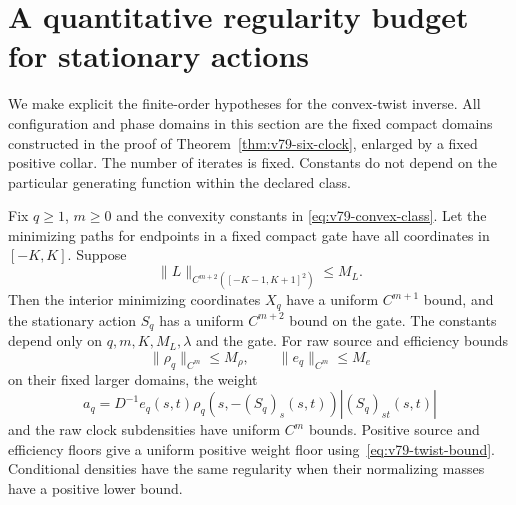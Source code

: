 \section{A quantitative regularity budget for stationary actions}
\label{sec:v80-regularity}

We make explicit the finite-order hypotheses for the convex-twist
inverse.  All configuration and phase domains in this section are the
fixed compact domains constructed in the proof of
Theorem~\ref{thm:v79-six-clock}, enlarged by a fixed positive collar.
The number of iterates is fixed.  Constants do not depend on the
particular generating function within the declared class.

\begin{proposition}
\label{prop:v80-stationary-bounds}
Fix $q\ge1$, $m\ge0$ and the convexity constants in
\eqref{eq:v79-convex-class}.  Let the minimizing paths for endpoints in
a fixed compact gate have all coordinates in $[-K,K]$.  Suppose
\[
              \|L\|_{C^{m+2}([-K-1,K+1]^2)}\le M_L.
\]
Then the interior minimizing coordinates $X_q$ have a uniform
$C^{m+1}$ bound, and the stationary action $S_q$ has a uniform
$C^{m+2}$ bound on the gate.  The constants depend only on
$q,m,K,M_L,\lambda$ and the gate.  For raw source and efficiency bounds
\[
 \|\rho_q\|_{C^m}\le M_\rho,\qquad \|e_q\|_{C^m}\le M_e
\]
on their fixed larger domains, the weight
\begin{equation}\label{eq:v80-weight-budget}
 a_q=D^{-1}e_q(s,t)\rho_q(s,-(S_q)_s(s,t))|(S_q)_{st}(s,t)|
\end{equation}
and the raw clock subdensities have uniform $C^m$ bounds.  Positive
source and efficiency floors give a uniform positive weight floor
using~\eqref{eq:v79-twist-bound}.  Conditional densities have the same
regularity when their normalizing masses have a positive lower bound.
\end{proposition}
